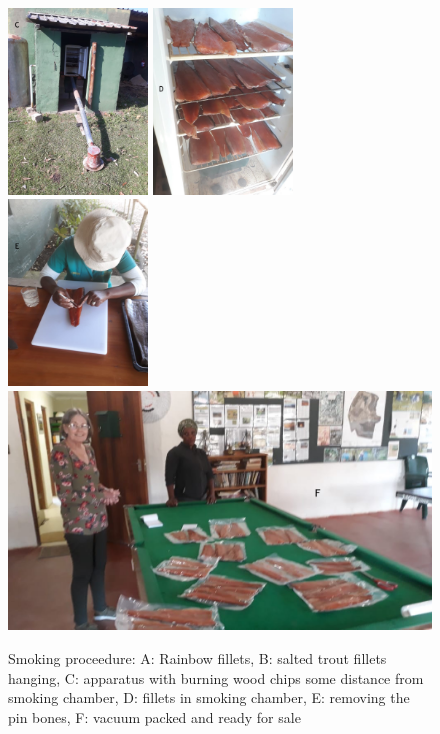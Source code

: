 \begin{figure}[H]
\includegraphics[height=140pt]{recipes/smoking/SmokingApparatus.jpg} \includegraphics[height=140pt]{recipes/smoking/FilletChamber.jpg} 
\includegraphics[height=140pt]{recipes/smoking/RemovingPinBones.jpg} \\
\includegraphics[height=180pt]{recipes/smoking/VacumePacked.jpg} 
   \caption{Smoking proceedure: A: Rainbow fillets, B: salted trout fillets hanging, C: apparatus with burning wood chips some distance from smoking chamber, D: fillets in smoking chamber, E: removing the pin bones, F: vacuum packed and ready for sale}
  \label{fig:SmokingProceedure}
\end{figure}  

